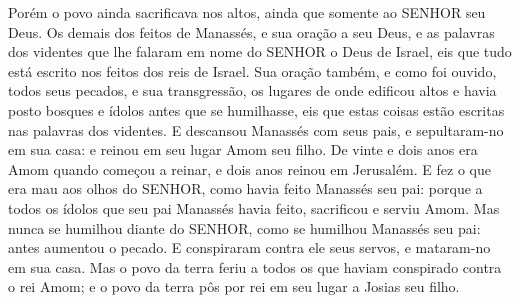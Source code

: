 {  Porém o povo ainda sacrificava nos altos, ainda que somente ao SENHOR seu Deus.
  Os demais dos feitos de Manassés, e sua oração a seu Deus, e as palavras dos videntes que lhe falaram em nome do SENHOR o Deus de Israel, eis que tudo está escrito nos feitos dos reis de Israel.
  Sua oração também, e como foi ouvido, todos seus pecados, e sua transgressão, os lugares de onde edificou altos e havia posto bosques e ídolos antes que se humilhasse, eis que estas coisas estão escritas nas palavras dos videntes.
  E descansou Manassés com seus pais, e sepultaram-no em sua casa: e reinou em seu lugar Amom seu filho.
  De vinte e dois anos era Amom quando começou a reinar, e dois anos reinou em Jerusalém.
  E fez o que era mau aos olhos do SENHOR, como havia feito Manassés seu pai: porque a todos os ídolos que seu pai Manassés havia feito, sacrificou e serviu Amom.
  Mas nunca se humilhou diante do SENHOR, como se humilhou Manassés seu pai: antes aumentou o pecado.
  E conspiraram contra ele seus servos, e mataram-no em sua casa.
  Mas o povo da terra feriu a todos os que haviam conspirado contra o rei Amom; e o povo da terra pôs por rei em seu lugar a Josias seu filho.
\par }

